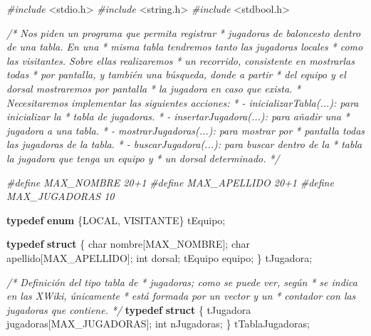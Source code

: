 \documentclass[
]{book}
\newenvironment{Shaded}{\begin{snugshade}}{\end{snugshade}}
\newcommand{\CommentTok}[1]{\textcolor[rgb]{0.56,0.35,0.01}{\textit{#1}}}
\newcommand{\DataTypeTok}[1]{\textcolor[rgb]{0.13,0.29,0.53}{#1}}
\newcommand{\ImportTok}[1]{#1}
\newcommand{\KeywordTok}[1]{\textcolor[rgb]{0.13,0.29,0.53}{\textbf{#1}}}
\newcommand{\NormalTok}[1]{#1}
\newcommand{\PreprocessorTok}[1]{\textcolor[rgb]{0.56,0.35,0.01}{\textit{#1}}}
\begin{document}
\begin{Shaded}
\begin{Highlighting}[]
\PreprocessorTok{\#include }\ImportTok{\textless{}stdio.h\textgreater{}}
\PreprocessorTok{\#include }\ImportTok{\textless{}string.h\textgreater{}}
\PreprocessorTok{\#include }\ImportTok{\textless{}stdbool.h\textgreater{}}

\CommentTok{/* Nos piden un programa que permita registrar}
\CommentTok{ * jugadoras de baloncesto dentro de una tabla. En una}
\CommentTok{ * misma tabla tendremos tanto las jugadoras locales}
\CommentTok{ * como las visitantes. Sobre ellas realizaremos}
\CommentTok{ * un recorrido, consistente en mostrarlas todas}
\CommentTok{ * por pantalla, y también una búsqueda, donde a partir}
\CommentTok{ * del equipo y el dorsal mostraremos por pantalla}
\CommentTok{ * la jugadora en caso que exista.}
\CommentTok{ * Necesitaremos implementar las siguientes acciones:}
\CommentTok{ * {-} inicializarTabla(...): para inicializar la}
\CommentTok{ *   tabla de jugadoras.}
\CommentTok{ * {-} insertarJugadora(...): para añadir una}
\CommentTok{ *   jugadora a una tabla.}
\CommentTok{ * {-} mostrarJugadoras(...): para mostrar por}
\CommentTok{ *   pantalla todas las jugadoras de la tabla.}
\CommentTok{ * {-} buscarJugadora(...): para buscar dentro de la}
\CommentTok{ *   tabla la jugadora que tenga un equipo y}
\CommentTok{ *   un dorsal determinado.}
\CommentTok{ */}
 
\PreprocessorTok{\#define MAX\_NOMBRE 20+1}
\PreprocessorTok{\#define MAX\_APELLIDO 20+1}
\PreprocessorTok{\#define MAX\_JUGADORAS 10}

\KeywordTok{typedef} \KeywordTok{enum}\NormalTok{ \{LOCAL, VISITANTE\} tEquipo;}

\KeywordTok{typedef} \KeywordTok{struct}\NormalTok{ \{}
    \DataTypeTok{char}\NormalTok{ nombre[MAX\_NOMBRE];}
    \DataTypeTok{char}\NormalTok{ apellido[MAX\_APELLIDO];}
    \DataTypeTok{int}\NormalTok{ dorsal;}
\NormalTok{    tEquipo equipo;}
\NormalTok{\} tJugadora;}

\CommentTok{/* Definición del tipo tabla de}
\CommentTok{ * jugadoras; como se puede ver, según}
\CommentTok{ * se indica en las XWiki, únicamente}
\CommentTok{ * está formada por un vector y un}
\CommentTok{ * contador con las jugadoras que contiene.}
\CommentTok{ */}
\KeywordTok{typedef} \KeywordTok{struct}\NormalTok{ \{}
\NormalTok{    tJugadora jugadoras[MAX\_JUGADORAS];}
    \DataTypeTok{int}\NormalTok{ nJugadoras;}
\NormalTok{\} tTablaJugadoras;}


\end{Highlighting}
\end{Shaded}
\end{document}
